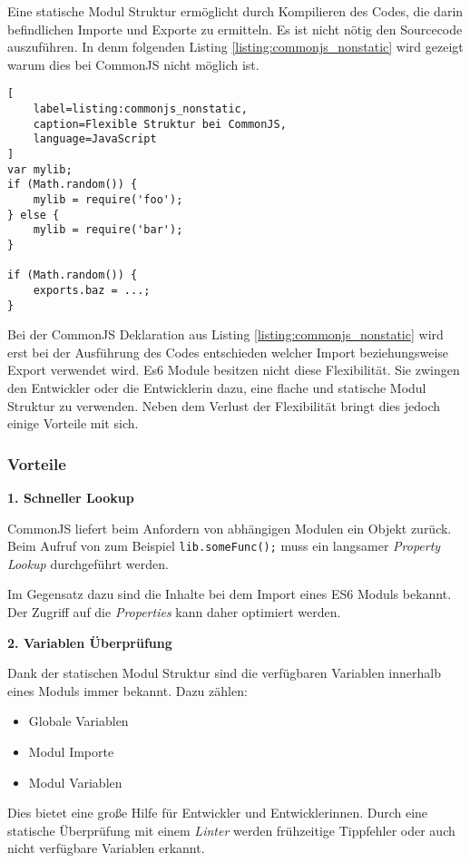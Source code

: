 Eine statische Modul Struktur ermöglicht durch Kompilieren des Codes, die darin befindlichen Importe und Exporte zu ermitteln. Es ist nicht nötig den Sourcecode auszuführen. In denm folgenden Listing \ref{listing:commonjs_nonstatic} wird gezeigt warum dies bei CommonJS nicht möglich ist. \autocite{Rauschmayer2014}

\begin{lstlisting}[
    label=listing:commonjs_nonstatic,
    caption=Flexible Struktur bei CommonJS,
	language=JavaScript
]
var mylib;
if (Math.random()) {
    mylib = require('foo');
} else {
    mylib = require('bar');
}

if (Math.random()) {
    exports.baz = ...;
}
\end{lstlisting}

Bei der CommonJS Deklaration aus Listing \ref{listing:commonjs_nonstatic} wird erst bei der Ausführung des Codes entschieden welcher Import beziehungsweise Export verwendet wird. Es6 Module besitzen nicht diese Flexibilität. Sie zwingen den Entwickler oder die Entwicklerin dazu, eine flache und statische Modul Struktur zu verwenden. Neben dem Verlust der Flexibilität bringt dies jedoch einige Vorteile mit sich. \autocite{Rauschmayer2014}

\subsubsection{Vorteile}

\textbf{1. Schneller Lookup}

CommonJS liefert beim Anfordern von abhängigen Modulen ein Objekt zurück. Beim Aufruf von zum Beispiel \lstinline{lib.someFunc();} muss ein langsamer \textit{Property Lookup} durchgeführt werden.

Im Gegensatz dazu sind die Inhalte bei dem Import eines ES6 Moduls bekannt. Der Zugriff auf die \textit{Properties} kann daher optimiert werden. \autocite{Rauschmayer2014}

\bigskip

\textbf{2. Variablen Überprüfung}

Dank der statischen Modul Struktur sind die verfügbaren Variablen innerhalb eines Moduls immer bekannt. Dazu zählen:
\begin{itemize}
\item Globale Variablen
\item Modul Importe
\item Modul Variablen
\end{itemize}
Dies bietet eine große Hilfe für Entwickler und Entwicklerinnen. Durch eine statische Überprüfung mit einem \textit{Linter} werden frühzeitige Tippfehler oder auch nicht verfügbare Variablen erkannt.\autocite{Rauschmayer2014}

